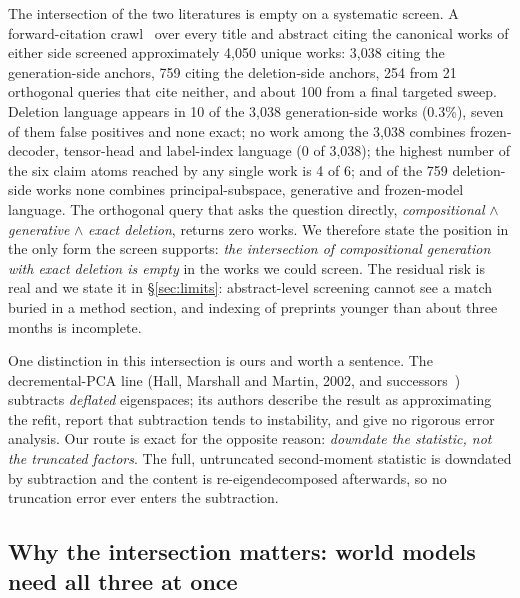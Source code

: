 \documentclass{article} %
\begin{document}
The intersection of the two literatures is empty on a systematic screen. A forward-citation
crawl~\citep{priem2022openalex} over every title and abstract citing the canonical works of either side screened
approximately 4,050 unique works: 3,038 citing the generation-side anchors, 759 citing the
deletion-side anchors, 254 from 21 orthogonal queries that cite neither, and about 100 from
a final targeted sweep. %
Deletion language appears in 10 of the 3,038 generation-side works (0.3\%), seven of them
false positives and none exact; no work among the 3,038 combines frozen-decoder,
tensor-head and label-index language (0 of 3,038); the highest number of the six claim
atoms reached by any single work is 4 of 6; and of the 759 deletion-side works none combines
principal-subspace, generative and frozen-model language. %
The orthogonal query that asks the question directly, \emph{compositional} $\wedge$
\emph{generative} $\wedge$ \emph{exact deletion}, returns zero works.
We therefore state the position in the only form the screen supports: \emph{the intersection
of compositional generation with exact deletion is empty} in the works we could screen.
The residual risk is real and we state it in \S\ref{sec:limits}: abstract-level screening
cannot see a match buried in a method section, and indexing of preprints younger than about
three months is incomplete.

One distinction in this intersection is ours and worth a sentence. The decremental-PCA line
(Hall, Marshall and Martin, 2002\nocite{hall2002adding,hall1999adding}, and successors~\citep{jin2014evd,lee2021fast}) subtracts \emph{deflated} eigenspaces; its
authors describe the result as approximating the refit, report that subtraction tends to
instability, and give no rigorous error analysis. Our route is exact for the opposite reason:
\emph{downdate the statistic, not the truncated factors}. The full, untruncated second-moment
statistic is downdated by subtraction and the content is re-eigendecomposed afterwards, so no
truncation error ever enters the subtraction.

\subsection{Why the intersection matters: world models need all three at once}
\label{sec:why}
\end{document}
